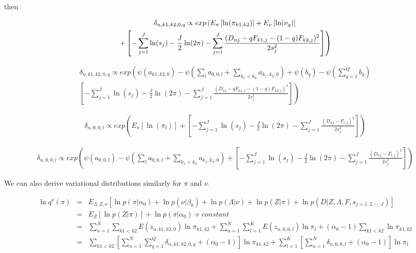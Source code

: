 \documentclass[12pt]{article}
\begin{document}
then 

\begin{multline}
 $$ \delta_{n, k1, k2, 0, q} \propto exp \left (  E_{\pi} \left [ \ln (\pi_{k1,k2}) \right] +  E_{\nu} \left [ \ln (\nu_{q}) \right ] \right. \\
 \left . +  \left [ - \sum_{j=1}^{J} \ln (s_j)  - \frac{J}{2} \ln (2 \pi) - \sum_{j=1}^{J} \frac{(D_{nj} - qF_{k1,j} - (1-q)F_{k2,j})^2}{2s^2_j} \right] \right ) 
\end{multline}

\begin{multline}
  \delta_{n, k1, k2, 0, q} \propto exp \left ( \psi({a_{k1, k2, 0}}) - \psi(\sum_{l} a_{0, 0, l} + \sum_{k_1 < k_2} a_{k_1, k_2, 0})  +   \psi(b_{q}) - \psi(\sum_{q=1}^{Q} b_{q}) \right . \\
  \left . \left [ - \sum_{j=1}^{J} \ln (s_j)  - \frac{J}{2} \ln (2 \pi) -  \sum_{j=1}^{J} \frac{(D_{nj} - qF_{k1,j} - (1-q)F_{k2,j})^2}{2s^2_j} \right] \right ) 
\end{multline}

\begin{multline}
\delta_{n, 0, 0, l} \propto exp \left (  E_{\pi} \left [ \ln (\pi_{l}) \right] +  \left [ - \sum_{j=1}^{J} \ln (s_j)  - \frac{J}{2} \ln (2 \pi) - \sum_{j=1}^{J} \frac{(D_{nj} - F_{l,j})^2}{2s^2_j} \right] \right ) 
\end{multline}

\begin{multline}
  \delta_{n, 0, 0, l} \propto exp \left ( \psi (a_{0, 0, l}) - \psi(\sum_{l} a_{0, 0, l} + \sum_{k_1 < k_2} a_{k_1, k_2, 0}) + \left [ - \sum_{j=1}^{J} \ln (s_j)  - \frac{J}{2} \ln (2 \pi) -  \sum_{j=1}^{J} \frac{(D_{nj} - F_{l,j})^2}{2s^2_j} \right] \right ) 
\end{multline}

We can also derive variational distributions similarly for $\pi$ and $\nu$.

\begin{eqnarray} \nonumber
\ln q^{\star} (\pi) &= & E_{\Lambda, Z, \nu} \left [ \ln p(\pi|\alpha_0) + \ln p(\nu | \beta_0) + \ln p(\Lambda | \nu) + \ln p(Z | \pi) + \ln p(D | Z, \Lambda, F, s_{j=1,2,\cdots,J}) \right ] \\ \nonumber
  & = & E_{Z} \left [ \ln p(Z | \pi) \right] + \ln p(\pi | \alpha_0) + constant \\ \nonumber
  & = & \sum_{n=1}^{N}\sum_{k1 < k2} E(z_{n, k1, k2, 0}) \ln \pi_{k1,k2} + \sum_{n=1}^{N}\sum_{l=1}^{K} E(z_{n, 0, 0, l}) \ln \pi_{l} +  (\alpha_0 -1) \sum_{k1 < k2} \ln \pi_{k1,k2} \\ \nonumber
  & = & \sum_{k1 < k2} \left [ \sum_{n=1}^{N} \sum_{q=1}^{Q} \delta_{n, k1, k2, 0, q} + (\alpha_0 -1) \right] \ln \pi_{k1, k2} + \sum_{l=1}^{K} \left [ \sum_{n=1}^{N} \delta_{n, 0, 0, l} + (\alpha_0 -1) \right] \ln \pi_{l}  \\ \nonumber
\end{eqnarray}
\end{document}
